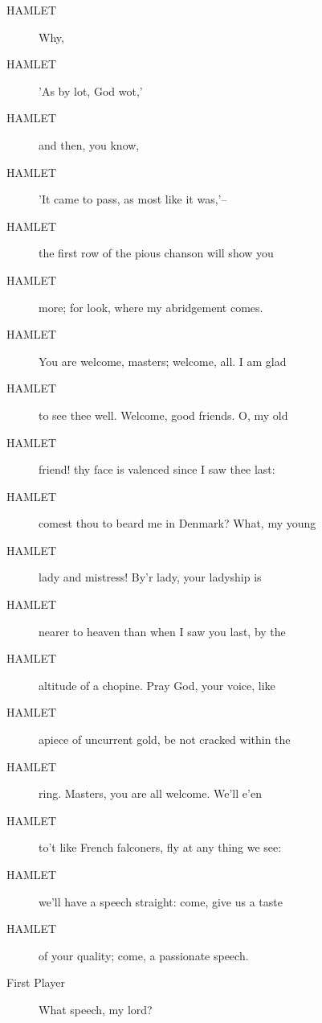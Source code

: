 \documentclass{article}
\begin{document}
\begin{description}
            
\item[HAMLET] Why,
\item[HAMLET] 'As by lot, God wot,'
\item[HAMLET] and then, you know,
\item[HAMLET] 'It came to pass, as most like it was,'--
\item[HAMLET] the first row of the pious chanson will show you
\item[HAMLET] more; for look, where my abridgement comes.
\item[HAMLET] You are welcome, masters; welcome, all. I am glad
\item[HAMLET] to see thee well. Welcome, good friends. O, my old
\item[HAMLET] friend! thy face is valenced since I saw thee last:
\item[HAMLET] comest thou to beard me in Denmark? What, my young
\item[HAMLET] lady and mistress! By'r lady, your ladyship is
\item[HAMLET] nearer to heaven than when I saw you last, by the
\item[HAMLET] altitude of a chopine. Pray God, your voice, like
\item[HAMLET] apiece of uncurrent gold, be not cracked within the
\item[HAMLET] ring. Masters, you are all welcome. We'll e'en
\item[HAMLET] to't like French falconers, fly at any thing we see:
\item[HAMLET] we'll have a speech straight: come, give us a taste
\item[HAMLET] of your quality; come, a passionate speech.
\end{description}
          
\begin{description}
            
\item[First Player] What speech, my lord?
\end{description}
          
\end{document}
